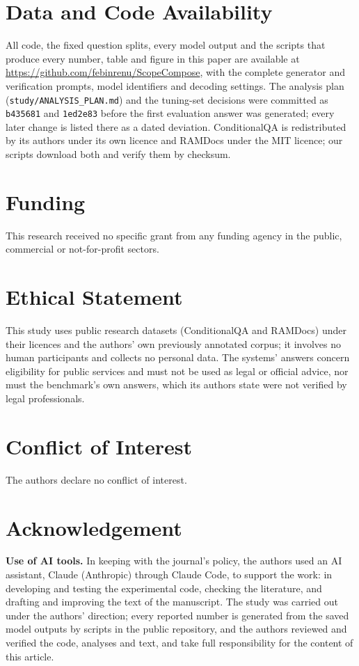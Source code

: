 \section*{\fontsize{12}{12}\selectfont\textbf{Data and Code Availability}}
All code, the fixed question splits, every model output and the scripts that produce every number, table and figure in this paper are available at \url{https://github.com/febinrenu/ScopeCompose}, with the complete generator and verification prompts, model identifiers and decoding settings. The analysis plan (\texttt{study/ANALYSIS\_PLAN.md}) and the tuning-set decisions were committed as \texttt{b435681} and \texttt{1ed2e83} before the first evaluation answer was generated; every later change is listed there as a dated deviation. ConditionalQA is redistributed by its authors under its own licence and RAMDocs under the MIT licence; our scripts download both and verify them by checksum.

\section*{\fontsize{12}{12}\selectfont\textbf{Funding}}
This research received no specific grant from any funding agency in the public, commercial or not-for-profit sectors.

\section*{\fontsize{12}{12}\selectfont\textbf{Ethical Statement}}
This study uses public research datasets (ConditionalQA and RAMDocs) under their licences and the authors' own previously annotated corpus; it involves no human participants and collects no personal data. The systems' answers concern eligibility for public services and must not be used as legal or official advice, nor must the benchmark's own answers, which its authors state were not verified by legal professionals.

\section*{\fontsize{12}{12}\selectfont\textbf{Conflict of Interest}}
The authors declare no conflict of interest.

\section*{\fontsize{12}{12}\selectfont\textbf{Acknowledgement}}
\textbf{Use of AI tools.} In keeping with the journal's policy, the authors used an AI assistant, Claude (Anthropic) through Claude Code, to support the work: in developing and testing the experimental code, checking the literature, and drafting and improving the text of the manuscript. The study was carried out under the authors' direction; every reported number is generated from the saved model outputs by scripts in the public repository, and the authors reviewed and verified the code, analyses and text, and take full responsibility for the content of this article.
